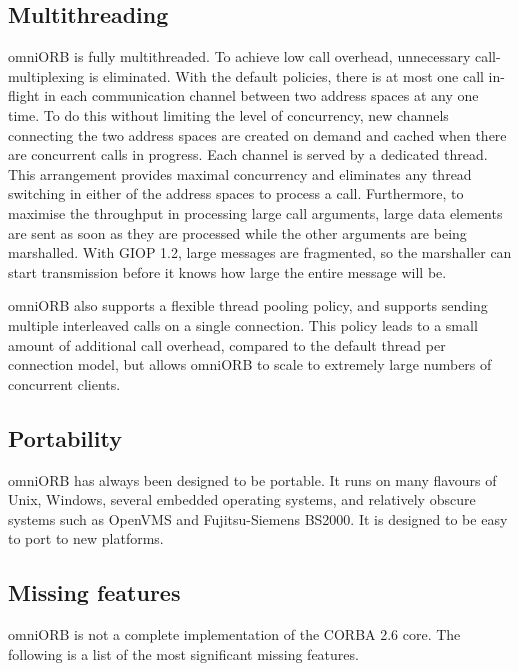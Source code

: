 \documentclass[11pt,oneside,a4paper]{book}
\begin{document}
\subsection{Multithreading}

omniORB is fully multithreaded. To achieve low call overhead,
unnecessary call-multiplexing is eliminated. With the default
policies, there is at most one call in-flight in each communication
channel between two address spaces at any one time. To do this without
limiting the level of concurrency, new channels connecting the two
address spaces are created on demand and cached when there are
concurrent calls in progress. Each channel is served by a dedicated
thread. This arrangement provides maximal concurrency and eliminates
any thread switching in either of the address spaces to process a
call. Furthermore, to maximise the throughput in processing large call
arguments, large data elements are sent as soon as they are processed
while the other arguments are being marshalled. With GIOP 1.2, large
messages are fragmented, so the marshaller can start transmission
before it knows how large the entire message will be.

omniORB also supports a flexible thread pooling policy, and supports
sending multiple interleaved calls on a single connection. This policy
leads to a small amount of additional call overhead, compared to the
default thread per connection model, but allows omniORB to scale to
extremely large numbers of concurrent clients.


\subsection{Portability}

omniORB has always been designed to be portable. It runs on many
flavours of Unix, Windows, several embedded operating systems, and
relatively obscure systems such as OpenVMS and Fujitsu-Siemens BS2000.
It is designed to be easy to port to new platforms.

\subsection{Missing features}
\label{sec:missing}

omniORB is not a complete implementation of the CORBA 2.6 core.
The following is a list of the most significant missing features.
\end{document}
